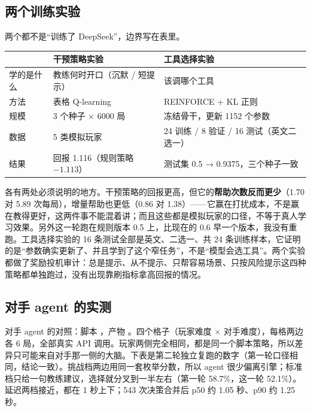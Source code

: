 \subsection{两个训练实验}

两个都不是“训练了 DeepSeek”，边界写在表里。

\begin{table}[h]
\centering
\small
\begin{tabular}{L{3.2cm}L{5.4cm}L{4.9cm}}
\toprule
 & 干预策略实验 & 工具选择实验 \\
\midrule
学的是什么 & 教练何时开口（沉默 / 短提示） & 该调哪个工具 \\
方法 & 表格 Q-learning & REINFORCE + KL 正则 \\
规模 & 3 个种子 × 6000 局 & 冻结骨干，更新 1152 个参数 \\
数据 & 5 类模拟玩家 & 24 训练 / 8 验证 / 16 测试（英文二选一） \\
结果 & 回报 1.116（规则策略 $-1.113$） & 测试集 0.5 → 0.9375，三个种子一致 \\
\bottomrule
\end{tabular}
\end{table}

各有两处必须说明的地方。干预策略的回报更高，但它的\textbf{帮助次数反而更少}（1.70 对 5.89 次每局），增量帮助也更低（0.86 对 1.38）——它赢在打扰成本，不是赢在教得更好，这两件事不能混着讲；而且这些都是模拟玩家的口径，不等于真人学习效果。另外这一轮跑在规则版本 0.5 上，比现在的 0.6 早一个版本，我没有重跑。工具选择实验的 16 条测试全部是英文、二选一、共 24 条训练样本，它证明的是“参数确实更新了、并且学到了这个窄任务”，不是“模型会选工具”。两个实验都做了奖励投机审计：总是提示、从不提示、只帮容易场景、只按风险提示这四种策略都单独跑过，没有出现靠刷指标拿高回报的情况。

\subsection{对手 agent 的实测}

对手 agent 的对照：脚本 ，产物 。四个格子（玩家难度 $\times$ 对手难度），每格两边各 6 局，全部真实 API 调用。玩家两侧完全相同，都是同一个脚本策略，所以差异只可能来自对手那一侧的大脑。下表是第二轮独立复跑的数字（第一轮口径相同，结论一致）。挑战档两边用同一套枚举分数，所以 agent 很少偏离引擎；标准档只给一句教练建议，选择就分叉到一半左右（第一轮 58.7\%，这一轮 52.1\%）。延迟两档接近，都在 1 秒上下；543 次决策合并后 p50 约 1.05 秒、p90 约 1.25 秒。

